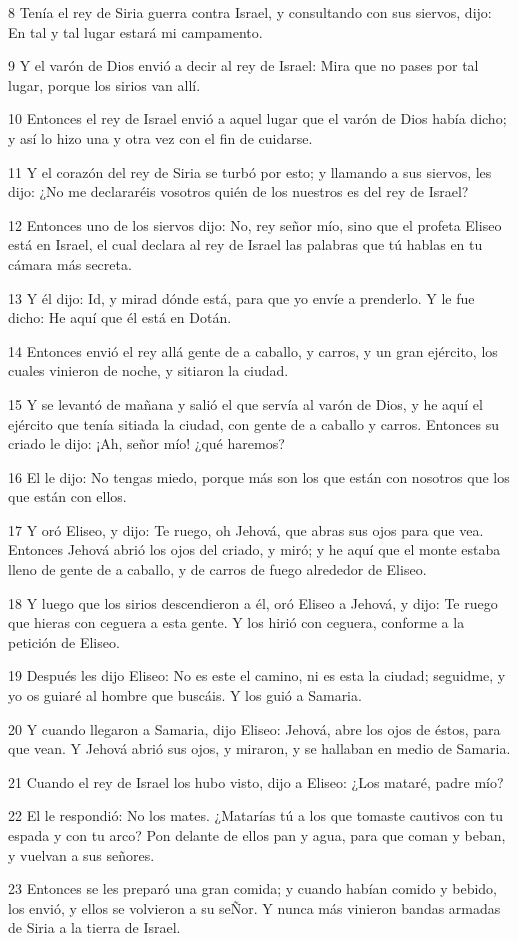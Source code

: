 \par 8 Tenía el rey de Siria guerra contra Israel, y consultando con sus siervos, dijo: En tal y tal lugar estará mi campamento.
\par 9 Y el varón de Dios envió a decir al rey de Israel: Mira que no pases por tal lugar, porque los sirios van allí.
\par 10 Entonces el rey de Israel envió a aquel lugar que el varón de Dios había dicho; y así lo hizo una y otra vez con el fin de cuidarse.
\par 11 Y el corazón del rey de Siria se turbó por esto; y llamando a sus siervos, les dijo: ¿No me declararéis vosotros quién de los nuestros es del rey de Israel?
\par 12 Entonces uno de los siervos dijo: No, rey señor mío, sino que el profeta Eliseo está en Israel, el cual declara al rey de Israel las palabras que tú hablas en tu cámara más secreta.
\par 13 Y él dijo: Id, y mirad dónde está, para que yo envíe a prenderlo. Y le fue dicho: He aquí que él está en Dotán.
\par 14 Entonces envió el rey allá gente de a caballo, y carros, y un gran ejército, los cuales vinieron de noche, y sitiaron la ciudad.
\par 15 Y se levantó de mañana y salió el que servía al varón de Dios, y he aquí el ejército que tenía sitiada la ciudad, con gente de a caballo y carros. Entonces su criado le dijo: ¡Ah, señor mío! ¿qué haremos?
\par 16 El le dijo: No tengas miedo, porque más son los que están con nosotros que los que están con ellos.
\par 17 Y oró Eliseo, y dijo: Te ruego, oh Jehová, que abras sus ojos para que vea. Entonces Jehová abrió los ojos del criado, y miró; y he aquí que el monte estaba lleno de gente de a caballo, y de carros de fuego alrededor de Eliseo.
\par 18 Y luego que los sirios descendieron a él, oró Eliseo a Jehová, y dijo: Te ruego que hieras con ceguera a esta gente. Y los hirió con ceguera, conforme a la petición de Eliseo.
\par 19 Después les dijo Eliseo: No es este el camino, ni es esta la ciudad; seguidme, y yo os guiaré al hombre que buscáis. Y los guió a Samaria.
\par 20 Y cuando llegaron a Samaria, dijo Eliseo: Jehová, abre los ojos de éstos, para que vean. Y Jehová abrió sus ojos, y miraron, y se hallaban en medio de Samaria.
\par 21 Cuando el rey de Israel los hubo visto, dijo a Eliseo: ¿Los mataré, padre mío?
\par 22 El le respondió: No los mates. ¿Matarías tú a los que tomaste cautivos con tu espada y con tu arco? Pon delante de ellos pan y agua, para que coman y beban, y vuelvan a sus señores.
\par 23 Entonces se les preparó una gran comida; y cuando habían comido y bebido, los envió, y ellos se volvieron a su seÑor. Y nunca más vinieron bandas armadas de Siria a la tierra de Israel.

